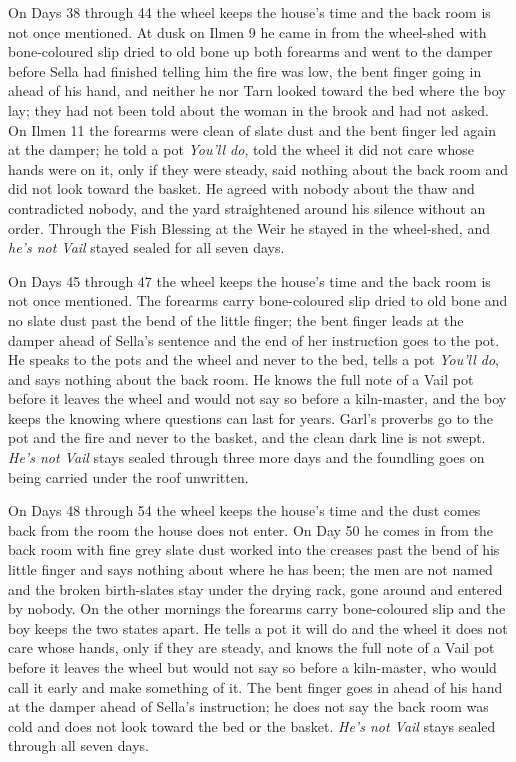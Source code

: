 \documentclass{design/chronicle}
\begin{document}
{On Days 38 through 44 the wheel keeps the house’s time and the back room is not once mentioned. At dusk on Ilmen 9 he came in from the wheel-shed with bone-coloured slip dried to old bone up both forearms and went to the damper before Sella had finished telling him the fire was low, the bent finger going in ahead of his hand, and neither he nor Tarn looked toward the bed where the boy lay; they had not been told about the woman in the brook and had not asked. On Ilmen 11 the forearms were clean of slate dust and the bent finger led again at the damper; he told a pot \emph{You’ll do}, told the wheel it did not care whose hands were on it, only if they were steady, said nothing about the back room and did not look toward the basket. He agreed with nobody about the thaw and contradicted nobody, and the yard straightened around his silence without an order. Through the Fish Blessing at the Weir he stayed in the wheel-shed, and \emph{he’s not Vail} stayed sealed for all seven days.

On Days 45 through 47 the wheel keeps the house’s time and the back room is not once mentioned. The forearms carry bone-coloured slip dried to old bone and no slate dust past the bend of the little finger; the bent finger leads at the damper ahead of Sella’s sentence and the end of her instruction goes to the pot. He speaks to the pots and the wheel and never to the bed, tells a pot \emph{You’ll do}, and says nothing about the back room. He knows the full note of a Vail pot before it leaves the wheel and would not say so before a kiln-master, and the boy keeps the knowing where questions can last for years. Garl’s proverbs go to the pot and the fire and never to the basket, and the clean dark line is not swept. \emph{He’s not Vail} stays sealed through three more days and the foundling goes on being carried under the roof unwritten.

On Days 48 through 54 the wheel keeps the house’s time and the dust comes back from the room the house does not enter. On Day 50 he comes in from the back room with fine grey slate dust worked into the creases past the bend of his little finger and says nothing about where he has been; the men are not named and the broken birth-slates stay under the drying rack, gone around and entered by nobody. On the other mornings the forearms carry bone-coloured slip and the boy keeps the two states apart. He tells a pot it will do and the wheel it does not care whose hands, only if they are steady, and knows the full note of a Vail pot before it leaves the wheel but would not say so before a kiln-master, who would call it early and make something of it. The bent finger goes in ahead of his hand at the damper ahead of Sella’s instruction; he does not say the back room was cold and does not look toward the bed or the basket. \emph{He’s not Vail} stays sealed through all seven days.

}
\end{document}
